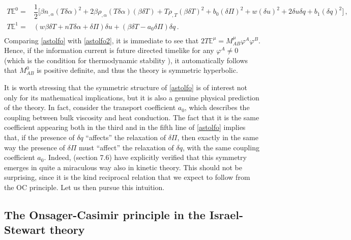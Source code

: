 \documentclass[a4paper, amsfonts, amssymb, amsmath, reprint, showkeys, nofootinbib, twoside, onecolumn,notitlepage]{revtex4-1}
\begin{document}
\begin{equation}\label{astolfo2}
\begin{split}
T\mathbb{E}^0 ={}&\dfrac{1}{2}\bigg[ \beta n_{,\alpha}(T\delta \alpha)^2 + 2\beta \rho_{,\alpha}(T\delta \alpha)(\beta \delta T)+T\rho_{,T}(\beta \delta T)^2+b_0 (\delta \Pi)^2 +w (\delta u)^2+2\delta u \delta q +b_1 (\delta q)^2 \bigg] \, , \\
T\mathbb{E}^1 ={}& (w \beta \delta T +nT\delta \alpha+\delta \Pi)\delta u + (\beta \delta T - a_0 \delta \Pi)\delta q \, .  \\
\end{split}
\end{equation}
Comparing \eqref{astolfo} with \eqref{astolfo2}, it is immediate to see that $2T\mathbb{E}^\mu=M^\mu_{AB}\varphi^A \varphi^B$. Hence, if the information current is future directed timelike for any $\varphi^A \neq 0$ (which is the condition for thermodynamic stability \cite{GavassinoCausality2021}), it automatically follows that $M^0_{AB}$ is positive definite, and thus the theory is symmetric hyperbolic.

It is worth stressing that the symmetric structure of \eqref{astolfo} is of interest not only for its mathematical implications, but it is also a genuine physical prediction of the theory. In fact, consider the transport coefficient $a_0$, which describes the coupling between bulk viscosity and heat conduction. The fact that it is the same coefficient appearing both in the third and in the fifth line of \eqref{astolfo} implies that, if the presence of $\delta q$ ``affects'' the relaxation of $\delta \Pi$, then exactly in the same way the presence of $\delta \Pi$ must ``affect'' the relaxation of $\delta q$, with the same coupling coefficient $a_0$. Indeed, \citet{Liu1986} (section 7.6) have explicitly verified that this symmetry emerges in quite a miraculous way also in kinetic theory. This should not be surprising, since it is the kind reciprocal relation that we expect to follow from the OC principle. Let us then pursue this intuition. 

\subsection{The Onsager-Casimir principle in the Israel-Stewart theory}
\end{document}
